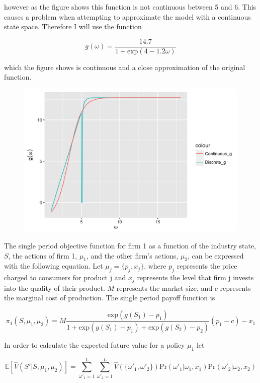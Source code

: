 \documentclass[12pt]{article}
\begin{document}
however as the figure shows this function is not continuous between 5 and 6. This causes a problem when attempting to approximate the model with a continuous state space. Therefore I will use the function

\begin{equation*}
  g(\omega) = \frac{14.7}{1+\text{exp}(4-1.2\omega)}
\end{equation*}

which the figure shows is continuous and a close approximation of the original function.

\begin{figure}[H]
  \centering
  \includegraphics{plot_g}
\end{figure}

The single period objective function for firm 1 as a function of the industry state, $S$, the actions of firm 1, $\mu_1$, and the other firm's actions, $\mu_2$, can be expressed with the following equation. Let $\mu_j=\{p_j,x_j\}$, where $p_j$ represents the price charged to consumers for product j and $x_j$ represents the level that firm j invests into the quality of their product. $M$ represents the market size, and $c$ represents the marginal cost of production. The single period payoff function is

\begin{equation*}
  \pi_1(S,\mu_{1},\mu_{2})=M \frac{\text{exp}(g(S_1)-p_1)}{1+\text{exp}(g(S_1)-p_1)+\text{exp}(g(S_2)-p_2)} (p_1-c)-x_1
\end{equation*}

In order to calculate the expected future value for a policy $\mu_1$ let

\begin{equation*}
  \mathbb{E}[\hat{V}(S'|S,\mu_{1},\mu_{2})] = \sum_{\omega'_1=1}^L \sum_{\omega'_2=1}^L \hat{V}(\{\omega'_1,\omega'_2\}) \text{Pr}(\omega'_1|\omega_1,x_{1}) \text{Pr}(\omega'_2|\omega_2,x_{2})
\end{equation*}
\end{document}
